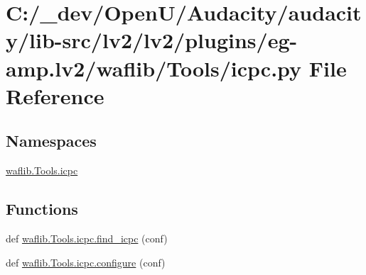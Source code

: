 \hypertarget{lv2_2plugins_2eg-amp_8lv2_2waflib_2_tools_2icpc_8py}{}\section{C\+:/\+\_\+dev/\+Open\+U/\+Audacity/audacity/lib-\/src/lv2/lv2/plugins/eg-\/amp.lv2/waflib/\+Tools/icpc.py File Reference}
\label{lv2_2plugins_2eg-amp_8lv2_2waflib_2_tools_2icpc_8py}
\subsection*{Namespaces}
\begin{DoxyCompactItemize}
\item 
 \hyperlink{namespacewaflib_1_1_tools_1_1icpc}{waflib.\+Tools.\+icpc}
\end{DoxyCompactItemize}
\subsection*{Functions}
\begin{DoxyCompactItemize}
\item 
def \hyperlink{namespacewaflib_1_1_tools_1_1icpc_a3f1e8dd3ca1313cf570316c73027db11}{waflib.\+Tools.\+icpc.\+find\+\_\+icpc} (conf)
\item 
def \hyperlink{namespacewaflib_1_1_tools_1_1icpc_ac5e97f409d9392b945bef908e0e7f9cd}{waflib.\+Tools.\+icpc.\+configure} (conf)
\end{DoxyCompactItemize}
